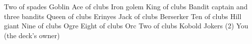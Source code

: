 Two of spades      Goblin                              
Ace of clubs       Iron golem                          
King of clubs      Bandit captain and   three bandits  
Queen of clubs     Erinyes                             
Jack of clubs      Berserker                           
Ten of clubs       Hill giant                          
Nine of clubs      Ogre                                
Eight of clubs     Orc                                 
Two of clubs       Kobold                              
Jokers (2)         You (the deck's owner)












